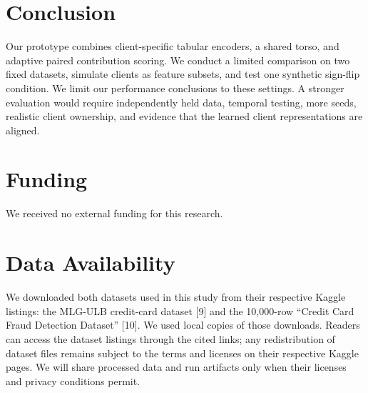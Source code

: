 \documentclass{ieeeaccess}
\begin{document}
\section{Conclusion}
Our prototype combines client-specific tabular encoders, a shared torso, and
adaptive paired contribution scoring. We conduct a limited comparison on two
fixed datasets, simulate clients as feature subsets, and test one synthetic
sign-flip condition. We limit our performance conclusions to these settings.
A stronger evaluation would require independently held data, temporal
testing, more seeds, realistic client ownership, and evidence that the learned
client representations are aligned.

\section*{Funding}
We received no external funding for this research.

\section*{Data Availability}
We downloaded both datasets used in this study from their respective Kaggle
listings: the MLG-ULB credit-card dataset [9] and the 10,000-row ``Credit Card
Fraud Detection Dataset'' [10]. We used local copies of those downloads.
Readers can access the dataset listings through the cited links; any
redistribution of dataset files remains subject to the terms and licenses on
their respective Kaggle pages. We will share processed data and run artifacts
only when their licenses and privacy conditions permit.
\end{document}
